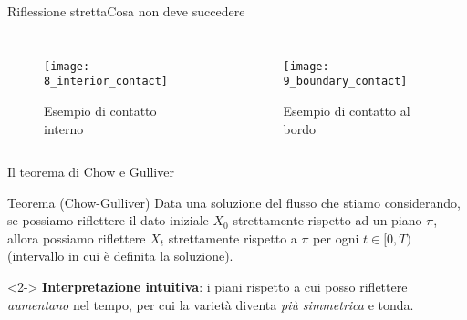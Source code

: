 \begin{frame}{Riflessione stretta}{Cosa non deve succedere}
	\begin{columns}
		\begin{figure}
			\begin{center}
				\texttt{[image: 8\_interior\_contact]}
				\caption{Esempio di contatto interno}
			\end{center}
		\end{figure}
		\begin{figure}
			\begin{center}
				\texttt{[image: 9\_boundary\_contact]}
				\caption{Esempio di contatto al bordo}
			\end{center}
		\end{figure}
	\end{columns}
\end{frame}




\begin{frame}{Il teorema di Chow e Gulliver}{}
	\begin{block}{Teorema (Chow-Gulliver)}
		Data una soluzione del flusso che stiamo considerando, se possiamo riflettere il dato iniziale $X_0$ strettamente rispetto ad un piano $\pi$, allora possiamo riflettere $X_t$ strettamente rispetto a $\pi$ per ogni $t\in [0,T)$ (intervallo in cui è definita la soluzione). 
	\end{block}
	\begin{block}{}<2->
		\textbf{Interpretazione intuitiva}: i piani rispetto a cui posso riflettere \textit{aumentano} nel tempo, per cui la varietà diventa \textit{più simmetrica} e tonda. 
	\end{block}
\end{frame}